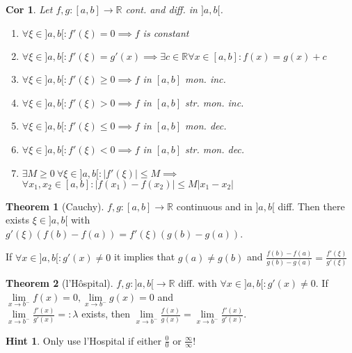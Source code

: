 \documentclass[a4paper, 10pt]{article}
\newtheorem*{corollary}{Cor}
\theoremstyle{definition}
\newtheorem*{note_wrapper}{Hint}
\theoremstyle{named}
\newtheorem*{ntheorem_wrapper}{Theorem}
\newenvironment{ntheorem}%
    {\begin{mdframed}[style=important]\begin{ntheorem_wrapper}}%
    {\end{ntheorem_wrapper}\end{mdframed}}
\newenvironment{note}%
    {\begin{mdframed}[style=trick]\begin{note_wrapper}}%
    {\end{note_wrapper}\end{mdframed}}
\newcommand{\R}{\mathbb{R}}
\begin{document}
\begin{corollary}
    Let $f, g: [a, b] \to \R$ cont. and diff. in $]a, b[$.
    \begin{enumerate}
        \item $\forall \xi \in ]a, b[: f'(\xi) = 0 \implies f$ is constant
        \item $\forall \xi \in ]a, b[: f'(\xi) = g'(x) \implies \exists c \in \R \forall x \in [a, b] : f(x) = g(x) + c$
        \item $\forall \xi \in ]a, b[: f'(\xi) \geq 0 \implies f$ in $[a, b]$ mon. inc.
        \item $\forall \xi \in ]a, b[: f'(\xi) > 0 \implies f$ in $[a, b]$ str. mon. inc.
        \item $\forall \xi \in ]a, b[: f'(\xi) \leq 0 \implies f$ in $[a, b]$ mon. dec.
        \item $\forall \xi \in ]a, b[: f'(\xi) < 0 \implies f$ in $[a, b]$ str. mon. dec.
        \item $\exists M \geq 0 \ \forall \xi \in ]a, b[ : |f'(\xi)| \leq M \implies$ \newline $\forall x_1, x_2 \in [a, b]: |f(x_1) - f(x_2)| \leq M |x_1 - x_2|$
    \end{enumerate}
\end{corollary}

\begin{ntheorem}[Cauchy]
    $f, g: [a, b] \to \R$ continuous and in $]a, b[$ diff. Then there exists $\xi \in ]a, b[$ with \\
    $g'(\xi)(f(b) - f(a)) = f'(\xi)(g(b) - g(a))$.

    If $\forall x \in ]a, b[ : g'(x) \neq 0$ it implies that $g(a) \neq g(b)$ and $\frac{f(b) - f(a)}{g(b) - g(a)} = \frac{f'(\xi)}{g'(\xi)}$
\end{ntheorem}

\begin{ntheorem}[l'Hôspital]
    $f,g : ]a, b[ \to \R$ diff. with $\forall x \in ]a, b[ : g'(x) \neq 0$.
    If $\lim\limits_{x \to b^-} f(x) = 0, \lim\limits_{x \to b^-} g(x) = 0$ and \\
    $\lim\limits_{x \to b^-} \frac{f'(x)}{g'(x)} =: \lambda$ exists, then $\lim\limits_{x \to b^-}\frac{f(x)}{g(x)} = \lim\limits_{x \to b^-}\frac{f'(x)}{g'(x)}$.
\end{ntheorem}

\begin{note}
    Only use l'Hospital if either $\frac{0}{0}$ or $\frac{\infty}{\infty}$!
\end{note}
\end{document}
